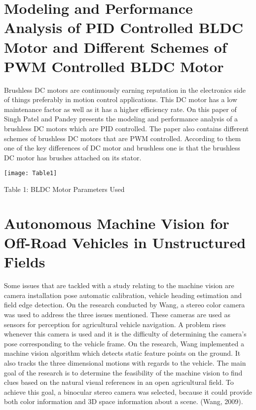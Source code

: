 \section{Modeling and Performance Analysis of PID Controlled BLDC Motor and Different Schemes of PWM Controlled BLDC Motor}

 Brushless DC motors are continuously earning reputation in the electronics side of things preferably in motion control applications. This DC motor has a low maintenance factor as well as it has a higher efficiency rate. On this paper of Singh Patel and Pandey presents the modeling and performance analysis of a brushless DC motors which are PID controlled. The paper also contains different schemes of brushless DC motors that are PWM controlled. According to them one of the key differences of DC motor and brushless one is that the brushless DC motor has brushes attached on its stator. 
\par
\par
\texttt{[image: Table1]}
\par
{\centering
  Table 1: BLDC Motor Parameters Used\par
}

\section{Autonomous Machine Vision for Off-Road Vehicles in Unstructured Fields}

Some issues that are tackled with a study relating to the machine vision are camera installation pose automatic calibration, vehicle heading estimation and field edge detection. On the research conducted by Wang, a stereo color camera was used to address the three issues mentioned. These cameras are used as sensors for perception for agricultural vehicle navigation. A problem rises whenever this camera is used and it is the difficulty of determining the camera’s pose corresponding to the vehicle frame. On the research, Wang implemented a machine vision algorithm which detects static feature points on the ground. It also tracks the three dimensional motions with regards to the vehicle. The main goal of the research is to determine the feasibility of the machine vision to find clues based on the natural visual references in an open agricultural field. To achieve this goal, a binocular stereo camera was selected, because it could provide both color information and 3D space information about a scene. (Wang, 2009).



